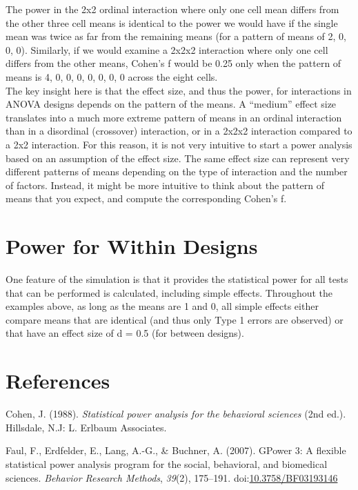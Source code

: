 \documentclass[,man,floatsintext]{apa6}
\begin{document}
The power in the 2x2 ordinal interaction where only one cell mean
differs from the other three cell means is identical to the power we
would have if the single mean was twice as far from the remaining means
(for a pattern of means of 2, 0, 0, 0). Similarly, if we would examine a
2x2x2 interaction where only one cell differs from the other means,
Cohen's f would be 0.25 only when the pattern of means is 4, 0, 0, 0, 0,
0, 0, 0 across the eight cells.\\
The key insight here is that the effect size, and thus the power, for
interactions in ANOVA designs depends on the pattern of the means. A
\enquote{medium} effect size translates into a much more extreme pattern
of means in an ordinal interaction than in a disordinal (crossover)
interaction, or in a 2x2x2 interaction compared to a 2x2 interaction.
For this reason, it is not very intuitive to start a power analysis
based on an assumption of the effect size. The same effect size can
represent very different patterns of means depending on the type of
interaction and the number of factors. Instead, it might be more
intuitive to think about the pattern of means that you expect, and
compute the corresponding Cohen's f.

\section{Power for Within Designs}\label{power-for-within-designs}

One feature of the simulation is that it provides the statistical power
for all tests that can be performed is calculated, including simple
effects. Throughout the examples above, as long as the means are 1 and
0, all simple effects either compare means that are identical (and thus
only Type 1 errors are observed) or that have an effect size of d = 0.5
(for between designs).

\newpage

\section{References}\label{references}

\setlength{\parindent}{-0.5in} \setlength{\leftskip}{0.5in}

\hypertarget{refs}{}
\hypertarget{ref-cohen_statistical_1988}{}
Cohen, J. (1988). \emph{Statistical power analysis for the behavioral
sciences} (2nd ed.). Hillsdale, N.J: L. Erlbaum Associates.

\hypertarget{ref-faul_gpower_2007}{}
Faul, F., Erdfelder, E., Lang, A.-G., \& Buchner, A. (2007). GPower 3: A
flexible statistical power analysis program for the social, behavioral,
and biomedical sciences. \emph{Behavior Research Methods}, \emph{39}(2),
175--191.
doi:\href{https://doi.org/10.3758/BF03193146}{10.3758/BF03193146}
\end{document}
